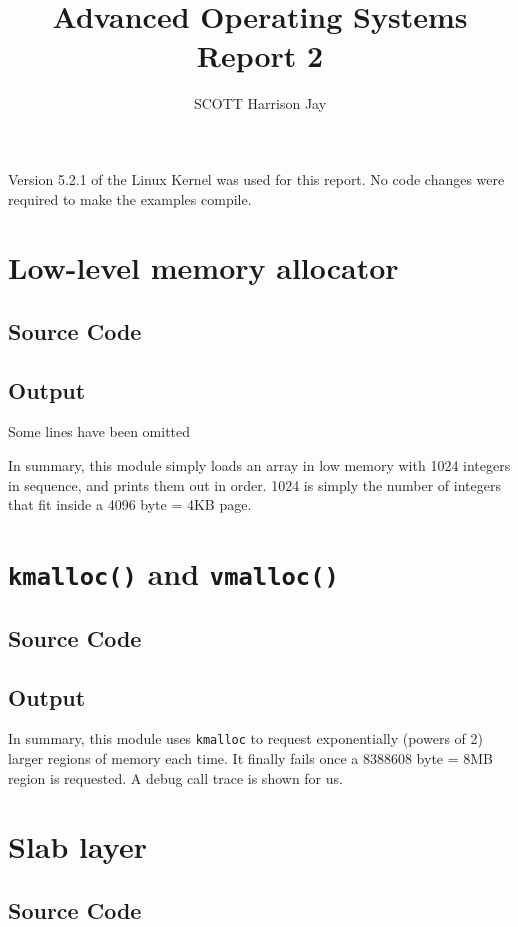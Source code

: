 \documentclass{article}
\title{Advanced Operating Systems Report 2}
\author{SCOTT Harrison Jay}
\begin{document}
\maketitle

Version 5.2.1 of the Linux Kernel was used for this report. No code changes were required to make the examples compile.

\section{Low-level memory allocator}

\subsection{Source Code}

\subsection{Output}
Some lines have been omitted

In summary, this module simply loads an array in low memory with 1024 integers in sequence, and prints them out in order. 1024 is simply the number of integers that fit inside a 4096 byte = 4KB page.

\section{\texttt{kmalloc()} and \texttt{vmalloc()}}

\subsection{Source Code}

\subsection{Output}

In summary, this module uses \texttt{kmalloc} to request exponentially (powers of 2) larger regions of memory each time. It finally fails once a 8388608 byte = 8MB region is requested. A debug call trace is shown for us.

\section{Slab layer}

\subsection{Source Code}

\end{document}
